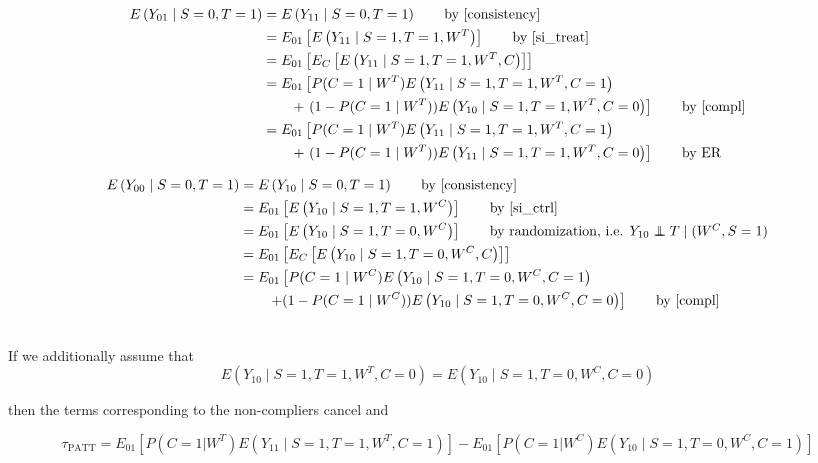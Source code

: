 \documentclass{article}
\newcommand{\pr}{P} %
\newcommand{\ex}{E} %
\newcommand\independent{\protect\mathpalette{\protect\independenT}{\perp}}
\def\independenT#1#2{\mathrel{\rlap{$#1#2$}\mkern2mu{#1#2}}}
\begin{document}
\begin{align*}
\ex\left(Y_{01} \mid S=0, T=1\right) &= \ex\left(Y_{11} \mid S=0, T=1\right) \tag*{by \eqref{consistency}} \\
&= \ex_{01}\left[  \ex\left(Y_{11} \mid S=1, T=1, W^T\right) \right] \tag*{by \eqref{si_treat}} \\
&= \ex_{01}\left[\ex_{C}\left[  \ex\left(Y_{11} \mid S=1, T=1, W^T, C\right) \right]\right]  \\
&= \ex_{01}\left[  \pr(C=1 \mid W^T) \ex\left(Y_{11} \mid S=1, T=1, W^T, C=1\right)\right. \\& \qquad+ \left.(1-\pr(C=1 \mid W^T))\ex\left(Y_{10} \mid S=1, T=1, W^T, C=0\right) \right]  \tag*{by \eqref{compl}} \\
&= \ex_{01}\left[  \pr(C=1 \mid W^T) \ex\left(Y_{11} \mid S=1, T=1, W^T, C=1\right)\right. \\& \qquad+ \left.(1-\pr(C=1 \mid W^T))\ex\left(Y_{11} \mid S=1, T=1, W^T, C=0\right) \right]  \tag*{by ER} \\
\end{align*}

\begin{align*}
\ex\left(Y_{00} \mid S=0, T=1\right) &= \ex\left(Y_{10} \mid S=0, T=1\right) \tag*{by \eqref{consistency}} \\
&= \ex_{01}\left[  \ex\left(Y_{10} \mid S=1, T=1, W^C\right) \right] \tag*{by \eqref{si_ctrl}} \\
&= \ex_{01}\left[  \ex\left(Y_{10} \mid S=1, T=0, W^C\right) \right] \tag*{by randomization, i.e. $Y_{10} \independent T \mid (W^C, S=1)$} \\
&= \ex_{01}\left[ \ex_{C}\left[  \ex\left(Y_{10} \mid S=1, T=0, W^C, C\right) \right]\right] \\
&=  \ex_{01}\left[  \pr(C = 1\mid W^C) \ex\left(Y_{10} \mid S=1, T=0, W^C, C=1\right)\right. \\&\qquad \left. + (1-\pr(C=1 \mid W^C)) \ex\left(Y_{10} \mid S=1, T=0, W^C, C=0\right) \right]   \tag*{by \eqref{compl}} \\\\
\end{align*}


If we additionally assume that 
$$\ex\left(Y_{10} \mid S=1, T=1, W^T, C=0\right) = \ex\left(Y_{10} \mid S=1, T=0, W^C, C=0\right)$$

then the terms corresponding to the non-compliers cancel and

\begin{equation}\label{patt}
\tau_{\text{PATT}} = \ex_{01}\left[  \pr(C=1 \vert W^T) \ex\left(Y_{11} \mid S=1, T=1, W^T, C=1\right)\right] -  \ex_{01}\left[ \pr(C=1 \vert W^C) \ex\left(Y_{10} \mid S=1, T=0, W^C, C=1\right)\right]
\end{equation}
\end{document}
